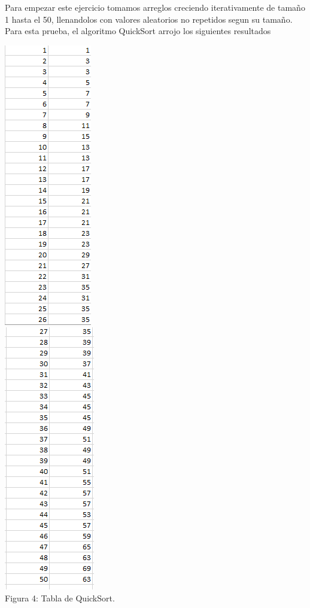\documentclass[spanish]{article}
\begin{document}
	\bigskip
	Para empezar este ejercicio tomamos arreglos creciendo iterativamente de tamaño 1 hasta el 50, llenandolos con valores 			aleatorios no repetidos segun su tamaño.
	Para esta prueba, el algoritmo QuickSort arrojo los siguientes resultados
	\begin{center}
	\includegraphics[scale=.5]{./imagenes/tqs/1.png}\\
	\includegraphics[scale=.5]{./imagenes/tqs/2.png}\\
		Figura 4: Tabla de QuickSort.
	\end{center}
\end{document}
